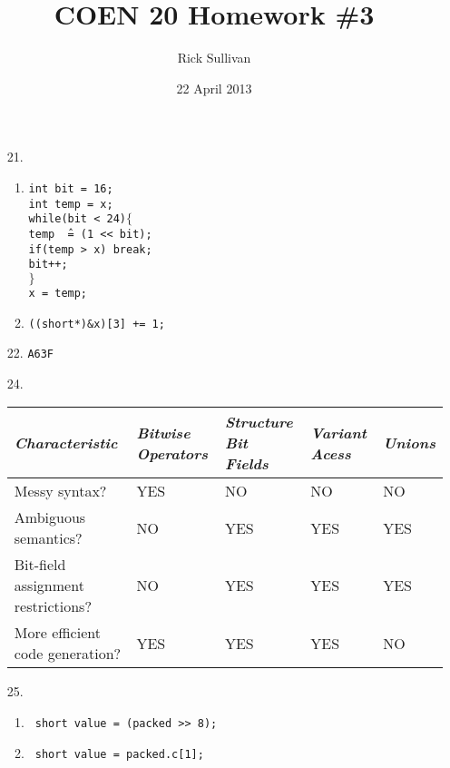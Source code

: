 \documentclass{article}
\title{COEN 20 Homework \#3}
\date{22 April 2013}
\author{Rick Sullivan}
\begin{document}
\maketitle

\begin{enumerate}
	\item[21.]
		\begin{enumerate}
			\item 	\begin{tabbing}
				\texttt{int bit = 16;} 	\\
				\texttt{int temp = x;} 	\\
				\texttt{while(bit < 24)$\{$ } \\
				\hspace{4ex}	\texttt{temp \^\ = (1 << bit);}	\\
				\hspace{4ex}	\texttt{if(temp > x) break;}	\\
				\hspace{4ex}	\texttt{bit++;}		\\
				\texttt{$\}$}		\\
				\texttt{x = temp;}	\\
				\end{tabbing}

			\item 	\texttt{((short*)\&x)[3] += 1;}
		\end{enumerate}

	\item[22.] \texttt{A63F}

	\item[24.] 
		\begin{tabular}{ p{4cm} | l | l | l | l}
			\hline
			\textit{Characteristic} & \textit{Bitwise Operators} & 
			\textit{Structure Bit Fields} & \textit{Variant Acess} & 
			\textit{Unions} \\ \hline
			Messy syntax? &	YES & NO & NO & NO\\ \hline 
			Ambiguous semantics? & NO & YES & YES & YES\\ \hline
			Bit-field assignment restrictions? & NO & YES & YES & YES\\ \hline
			More efficient code generation? & YES & YES & YES & NO \\ \hline

		\end{tabular}
	
	\item[25.]
		\begin{enumerate}
			\item \texttt{ short value = (packed >> 8); }

			\item \texttt{ short value = packed.c[1]; }
		\end{enumerate}

\end{enumerate}
\end{document}
